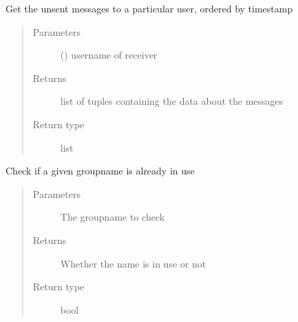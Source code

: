 \documentclass[letterpaper,10pt,english]{sphinxmanual}
\begin{document}

\begin{fulllineitems}
\label{\detokenize{db:db.getUnsentMessages}}
Get the unsent messages to a particular user, ordered by timestamp
\begin{quote}\begin{description}
\item[{Parameters}] \leavevmode
{} () \textendash{} username of receiver

\item[{Returns}] \leavevmode
list of tuples containing the data about the messages

\item[{Return type}] \leavevmode
list

\end{description}\end{quote}

\end{fulllineitems}


\begin{fulllineitems}
\label{\detokenize{db:db.checkIfGroupNameFree}}
Check if a given groupname is already in use
\begin{quote}\begin{description}
\item[{Parameters}] \leavevmode
{} \textendash{} The groupname to check

\item[{Returns}] \leavevmode
Whether the name is in use or not

\item[{Return type}] \leavevmode
bool

\end{description}\end{quote}

\end{fulllineitems}
\end{document}
